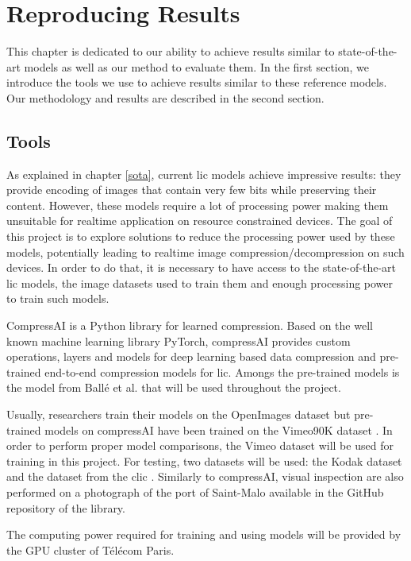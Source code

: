 \chapter{Reproducing Results}
\label{part_1}
This chapter is dedicated to our ability to achieve results similar to state-of-the-art models as well as our method to evaluate them. In the first section, we introduce the tools we use to achieve results similar to these reference models. Our methodology and results are described in the second section.

\section{Tools}
As explained in chapter \ref{sota}, current \acrshort{lic} models achieve impressive results: they provide encoding of images that contain very few bits while preserving their content. However, these models require a lot of processing power making them unsuitable for realtime application on resource constrained devices. The goal of this project is to explore solutions to reduce the processing power used by these models, potentially leading to realtime image compression/decompression on such devices. In order to do that, it is necessary to have access to the state-of-the-art \acrshort{lic} models, the image datasets used to train them and enough processing power to train such models.

CompressAI \cite{compressai} is a Python library for learned compression. Based on the well known machine learning library PyTorch, compressAI provides custom operations, layers and models for deep learning based data compression and pre-trained end-to-end compression models for \acrshort{lic}. Amongs the pre-trained models is the model from Ballé et al. \cite{ballé2018variationalimagecompressionscale} that will be used throughout the project.

Usually, researchers train their models on the OpenImages dataset \cite{openimages} but pre-trained models on compressAI have been trained on the Vimeo90K dataset \cite{xue2019video}. In order to perform proper model comparisons, the Vimeo dataset will be used for training in this project. For testing, two datasets will be used: the Kodak dataset \cite{kodak} and the dataset from the \acrfull{clic} \cite{clic}. Similarly to compressAI, visual inspection are also performed on a photograph of the port of Saint-Malo available in the GitHub repository of the library.

The computing power required for training and using models will be provided by the GPU cluster of Télécom Paris.

